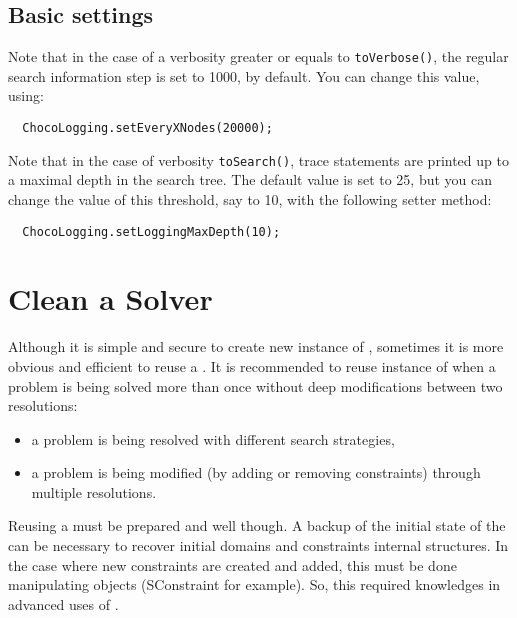 \subsection{Basic settings}\label{solver:logbasicsettings}\hypertarget{solver:logbasicsettings}{}

Note that in the case of a verbosity greater or equals to \texttt{toVerbose()}, the regular search information step is set to 1000, by default. You can change this value, using:
\begin{lstlisting}
  ChocoLogging.setEveryXNodes(20000);
\end{lstlisting}
 

Note that in the case of verbosity \texttt{toSearch()}, trace statements are printed up to a maximal depth in the search tree. The default value is set to 25, but you can change the value of this threshold, say to 10, with the following setter method:
\begin{lstlisting}
  ChocoLogging.setLoggingMaxDepth(10);
\end{lstlisting}


\section{Clean a Solver}\label{solver:clean}\hypertarget{solver:clean}{}

Although it is simple and secure to create new instance of , sometimes it  is more obvious and efficient to reuse a . 
It is recommended to reuse instance of  when a problem is being solved more than once without deep modifications between two resolutions:
\begin{itemize}
\item a problem is being resolved with different search strategies,
\item a problem is being modified (by adding or removing constraints) through multiple resolutions.
\end{itemize}

\begin{note}
Reusing a  must be prepared and well though. A backup of the initial state of the  can be necessary to recover initial domains and constraints internal structures. In the case where new constraints are created and added, this must be done manipulating  objects (SConstraint for example). So, this required knowledges in advanced uses of .
\end{note}


